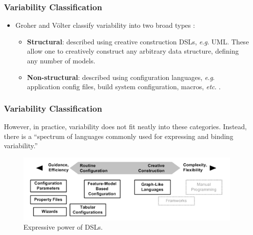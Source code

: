 \documentclass{beamer}
\newcommand{\eg}{\textit{e}.\textit{g}. }
\newcommand{\etc}{\textit{etc}. }
\begin{document}
\begin{frame}
\frametitle{Variability Classification}

\begin{itemize}

\item Groher and V{\"o}lter classify variability into two broad types
  \cite{groher2007expressing}:

\pause

\begin{itemize}
\item \textbf{Structural}: described using creative construction DSLs,
  \eg \ac{UML}. These allow one to creatively construct any arbitrary
  data structure, defining any number of models.

\pause

\item \textbf{Non-structural}: described using configuration
  languages, \eg application config files, build system configuration,
  macros, \etc.

\end{itemize}

\end{itemize}

\end{frame}

\begin{frame}
\frametitle{Variability Classification}

However, in practice, variability does not fit neatly into these
categories. Instead, there is a ``spectrum of languages commonly used
for expressing and binding variability.''\cite{groher2007expressing}

\begin{figure}
  \centering
  \includegraphics[scale=0.6]{images/variability_spectrum_voelter.png}
  \caption{Expressive power of \ac{DSL}s.\cite{groher2007expressing}}
\end{figure}

\end{frame}
\end{document}
